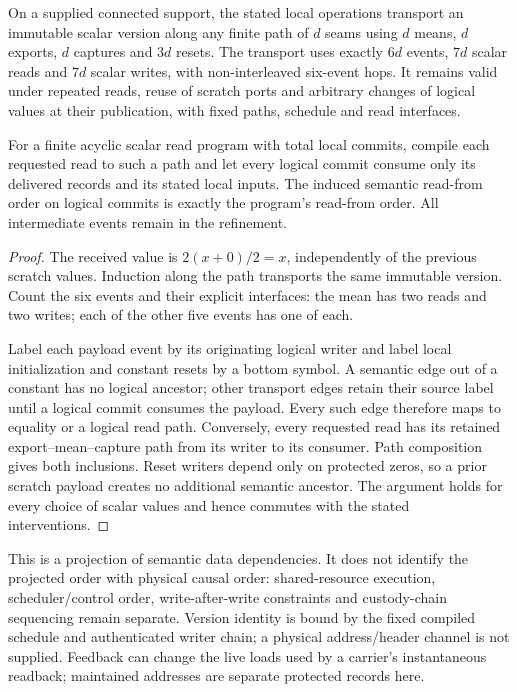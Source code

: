 \begin{theorem}
\label{thm:source-feedback-transport}
On a supplied connected support, the stated local operations transport an
immutable scalar version along any finite path of $d$ seams using $d$ means,
$d$ exports, $d$ captures and $3d$ resets. The transport uses exactly $6d$
events, $7d$ scalar reads and $7d$ scalar writes, with non-interleaved
six-event hops. It remains valid under
repeated reads, reuse of scratch ports and arbitrary changes of logical
values at their publication, with fixed paths, schedule and read interfaces.

For a finite acyclic scalar read program with total local commits,
compile each requested read to
such a path and let every logical commit consume only its delivered records
and its stated local inputs. The induced semantic read-from order on logical
commits is exactly the program's read-from order. All intermediate events
remain in the refinement.
\end{theorem}
\begin{proof}
The received value is $2(x+0)/2=x$, independently of the previous scratch
values. Induction along the path transports the same immutable version.
Count the six events and their explicit interfaces: the mean has two reads
and two writes; each of the other five events has one of each.

Label each payload event by its originating logical writer and label local
initialization and constant resets by a bottom symbol. A semantic edge out
of a constant has no logical ancestor; other transport edges retain their
source label until a logical commit consumes the payload. Every such edge
therefore maps to equality or a logical read path. Conversely, every
requested read has its retained export--mean--capture path from its writer
to its consumer. Path composition gives both inclusions. Reset writers
depend only on protected zeros, so a prior scratch payload creates no
additional semantic ancestor. The argument holds for every choice of scalar
values and hence commutes with the stated interventions.
\end{proof}

This is a projection of semantic data dependencies. It does not identify
the projected order with physical causal order: shared-resource execution,
scheduler/control order, write-after-write constraints and custody-chain
sequencing remain separate.
Version identity is bound by the fixed compiled schedule and authenticated
writer chain; a physical address/header channel is not supplied.
Feedback can change the live loads used by a carrier's instantaneous
readback; maintained addresses are separate protected records here.

